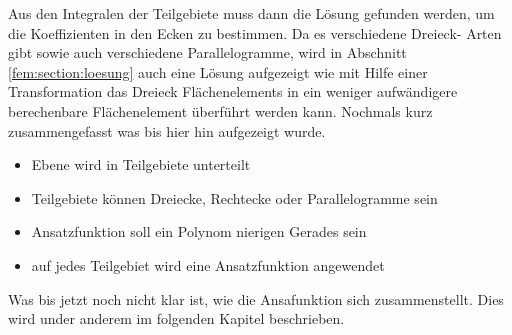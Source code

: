 


 




Aus den Integralen der Teilgebiete muss dann die Lösung gefunden werden, um die Koeffizienten in den Ecken zu bestimmen.
Da es verschiedene Dreieck- Arten gibt sowie auch verschiedene Parallelogramme, wird in Abschnitt \ref{fem:section:loesung} auch eine Lösung aufgezeigt wie mit Hilfe einer Transformation das Dreieck Flächenelements in ein weniger aufwändigere berechenbare Flächenelement überführt werden kann.
Nochmals kurz zusammengefasst was bis hier hin aufgezeigt wurde.
\begin{itemize}
	\item Ebene wird in Teilgebiete unterteilt
	\item Teilgebiete können Dreiecke, Rechtecke oder Parallelogramme sein
	\item Ansatzfunktion soll ein Polynom nierigen Gerades sein
	\item auf jedes Teilgebiet wird eine Ansatzfunktion angewendet
\end{itemize} 
Was bis jetzt noch nicht klar ist, wie die Ansafunktion sich zusammenstellt. Dies wird under anderem im folgenden Kapitel beschrieben.





